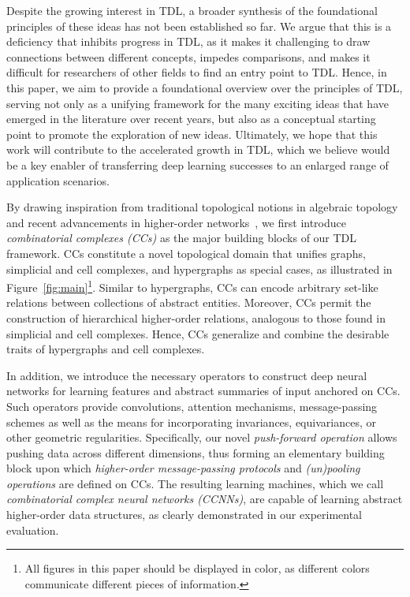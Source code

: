 Despite the growing interest in TDL, a broader synthesis of the foundational principles of these ideas has not been established so far. We argue that this is a deficiency that inhibits progress in TDL, as it makes it challenging to draw connections between different concepts, impedes comparisons, and makes it difficult for researchers of other fields to find an entry point to TDL. Hence, in this paper, we aim to provide a foundational overview over the principles of TDL, serving not only as a unifying framework for the many exciting ideas that have emerged in the literature over recent years, but also as a conceptual starting point to promote the exploration of new ideas. Ultimately, we hope that this work will contribute to the accelerated growth in TDL, which we believe would be a key enabler of transferring deep learning successes to an enlarged range of application scenarios.

By drawing inspiration from traditional topological notions in algebraic topology~\cite{ghrist2014elementary,hatcher2005algebraic} and recent advancements in higher-order networks~\cite{battiston2020networks,torres2021and,bick2021higher,battiston2021physics}, we first introduce \emph{combinatorial complexes (CCs)} as the major building blocks of our TDL framework. CCs constitute a novel topological domain that unifies graphs, simplicial and cell complexes, and hypergraphs as special cases, as illustrated in Figure~\ref{fig:main}\footnote{All figures in this paper should be displayed in color, as different colors communicate different pieces of information.}. 
Similar to hypergraphs, CCs can encode arbitrary set-like relations between collections of abstract entities. Moreover, CCs permit the construction of hierarchical higher-order relations, analogous to those found in simplicial and cell complexes. Hence, CCs generalize and combine the desirable traits of hypergraphs and cell complexes. 

In addition, we introduce the necessary operators to construct deep neural networks for learning features and abstract summaries of input anchored on CCs. Such operators provide convolutions, attention mechanisms, message-passing schemes as well as the means for incorporating invariances, equivariances, or other geometric regularities. Specifically, our novel \emph{push-forward operation} allows pushing data across different dimensions, thus forming an elementary building block upon which \emph{higher-order message-passing protocols} and \emph{(un)pooling operations} are defined on CCs. The resulting learning machines, which we call \emph{combinatorial complex neural networks (CCNNs)}, are capable of learning abstract higher-order data structures, as clearly demonstrated in our experimental evaluation. 

